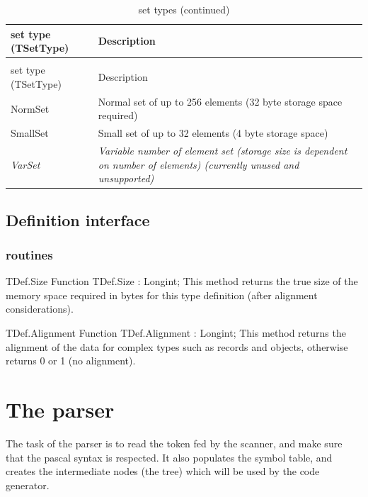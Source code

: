 \documentclass [a4paper,12pt]{article}
\begin{document}
\begin{longtable}{|l|p{10cm}|}
\caption{set types}\label{tsettype}\\
\hline
set type (TSetType) & Description \\
\hline
\endfirsthead
\caption{set types (continued)}\\
\hline
set type (TSetType) & Description \\
\hline
\endhead
\hline
\endfoot
\textsf{NormSet}&
    Normal set of up to 256 elements (32 byte storage space required) \\
\textsf{SmallSet}&
    Small set of up to 32 elements (4 byte storage space) \\
\textsf{\textit{VarSet}}&
    \textit{Variable number of element set (storage size is dependent on number
    of elements) (currently unused and unsupported)} \\
\end{longtable}

\subsection{Definition interface}
\label{subsec:definition}

\subsubsection{routines}

\begin{function}{TDef.Size}
\Declaration
Function TDef.Size : Longint;
\Description
This method returns the true size of the memory space required in bytes for
this type definition (after alignment considerations).
\end{function}

\begin{function}{TDef.Alignment}
\Declaration
Function TDef.Alignment : Longint;
\Description
This method returns the alignment of the data for complex types such as
records and objects, otherwise returns 0 or 1 (no alignment).
\end{function}

\section{The parser}
\label{sec:mylabel5}

The task of the parser is to read the token fed by the scanner, and make
sure that the pascal syntax is respected. It also populates the symbol
table, and creates the intermediate nodes (the tree) which will be used by
the code generator.
\end{document}
